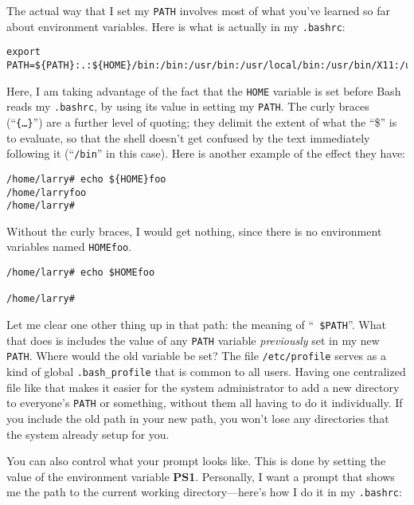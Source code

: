         The actual way that I set my {\tt PATH} involves most of what
you've learned so far about environment variables.  Here is what is
actually in my {\tt .bashrc}:

\begin{screen}\begin{verbatim}
export PATH=${PATH}:.:${HOME}/bin:/bin:/usr/bin:/usr/local/bin:/usr/bin/X11:/usr/TeX/bin
\end{verbatim}\end{screen}

        Here, I am taking advantage of the fact that the {\tt HOME}
variable is set before Bash reads my {\tt .bashrc}, by using its value
in setting my {\tt PATH}.  The curly braces (``{\tt \{\ldots\}}'') are
a further level of quoting; they delimit the extent of what the ``\$''
is to evaluate, so that the shell doesn't get confused by the text
immediately following it (``{\tt /bin}'' in this case).  Here is
another example of the effect they have:

\begin{screen}\begin{verbatim}
/home/larry# echo ${HOME}foo
/home/larryfoo
/home/larry#
\end{verbatim}\end{screen}

Without the curly braces, I would get nothing, since there is no
environment variables named {\tt HOMEfoo}.

\begin{screen}\begin{verbatim}
/home/larry# echo $HOMEfoo

/home/larry#
\end{verbatim}\end{screen}

Let me clear one other thing up in that path: the meaning of ``{\tt
  \${PATH}}''.  What that does is includes the value of any {\tt PATH}
variable {\em previously\/} set in my new {\tt PATH}. Where would the
old variable be set? The file {\tt /etc/profile} serves as a kind of
global {\tt .bash\_profile} that is common to all users.  Having one
centralized file like that makes it easier for the system
administrator to add a new directory to everyone's {\tt PATH} or
something, without them all having to do it individually. If you
include the old path in your new path, you won't lose any directories
that the system already setup for you.

You can also control what your prompt looks like.  This is done by
setting the value of the environment variable {\bf PS1}.  Personally,
I want a prompt that shows me the path to the current working
directory---here's how I do it in my {\tt .bashrc}:

